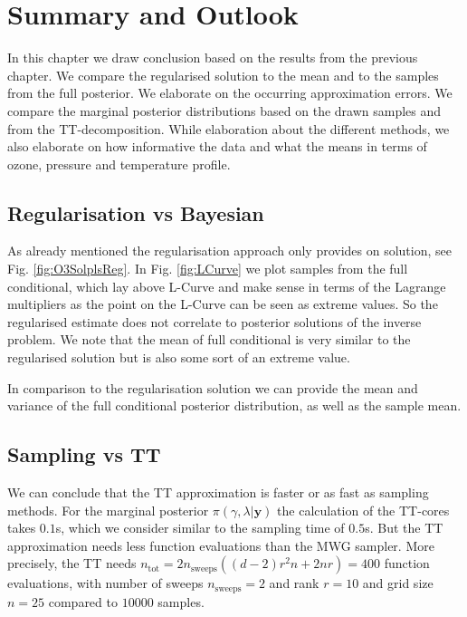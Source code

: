 \chapter{Summary and Outlook}
\label{ch:Concl}
In this chapter we draw conclusion based on the results from the previous chapter.
We compare the regularised solution to the mean and to the samples from the full posterior.
We elaborate on the occurring approximation errors.
We compare the marginal posterior distributions based on the drawn samples and from the TT-decomposition.
While elaboration about the different methods, we also elaborate on how informative the data and what the means in terms of ozone, pressure and temperature profile. 


\section{Regularisation vs Bayesian}
As already mentioned the regularisation approach only provides on solution, see Fig. \ref{fig:O3SolplsReg}.
In Fig. \ref{fig:LCurve} we plot samples from the full conditional, which lay above L-Curve and make sense in terms of the Lagrange multipliers as the point on the L-Curve can be seen as extreme values.
So the regularised estimate does not correlate to posterior solutions of the inverse problem.
We note that the mean of full conditional is very similar to the regularised solution but is also some sort of an extreme value.

In comparison to the regularisation solution we can provide the mean and variance of the full conditional posterior distribution, as well as the sample mean.




\section{Sampling vs TT}
We can conclude that the TT approximation is faster or as fast as sampling methods.
For the marginal posterior $\pi(\gamma, \lambda | \bm{y})$ the calculation of the TT-cores takes $0.1$s, which we consider similar to the sampling time of $0.5$s.
But the TT approximation needs less function evaluations than the MWG sampler.
More precisely, the TT needs $n_{\text{tot}} = 2n_{\text{sweeps}}((d-2)r^2n+ 2nr) = 400$ function evaluations, with number of sweeps $n_{\text{sweeps}} =2$ and rank $r=10$ and grid size $n = 25$ compared to $10000$ samples.

